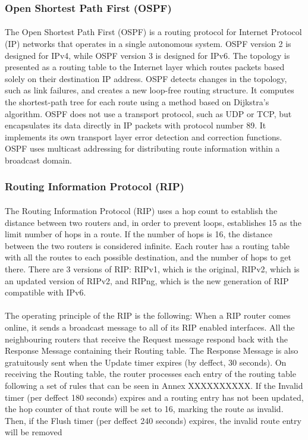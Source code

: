 \subsubsection*{Open Shortest Path First (OSPF)\cite{OSPFv2}\cite{OSPFIPv6}}
\paragraph{}The Open Shortest Path First (OSPF) is a routing protocol for Internet Protocol (IP) networks that operates in a single autonomous system. OSPF version 2 is designed for IPv4, while OSPF version 3 is designed for IPv6. The topology is presented as a routing table to the Internet layer which routes packets based solely on their destination IP address. OSPF detects changes in the topology, such as link failures, and creates a new loop-free routing structure. It computes the shortest-path tree for each route using a method based on Dijkstra's algorithm. OSPF does not use a transport protocol, such as UDP or TCP, but encapsulates its data directly in IP packets with protocol number 89. It implements its own transport layer error detection and correction functions. OSPF uses multicast addressing for distributing route information within a broadcast domain.

\subsubsection*{Routing Information Protocol (RIP)\cite{RIPv2}\cite{RIPng}}
\paragraph{}The Routing Information Protocol (RIP) uses a hop count to establish the distance between two routers and, in order to prevent loops, establishes 15 as the limit number of hops in a route. If the number of hops is 16, the distance between the two routers is considered infinite. Each router has a routing table with all the routes to each possible destination, and the number of hops to get there. There are 3 versions of RIP: RIPv1, which is the original, RIPv2, which is an updated version of RIPv2, and RIPng, which is the new generation of RIP compatible with IPv6.
\paragraph{}The operating principle of the RIP is the following: When a RIP router comes online, it sends a broadcast message to all of its RIP enabled interfaces. All the neighbouring routers that receive the Request message respond back with the Response Message containing their Routing table. The Response Message is also gratuitously sent when the Update timer expires (by deffect, 30 seconds). On receiving the Routing table, the router processes each entry of the routing table following a set of rules that can be seen in Annex XXXXXXXXXX. If the Invalid timer (per deffect 180 seconds) expires and a routing entry has not been updated, the hop counter of that route will be set to 16, marking the route as invalid. Then, if the Flush timer (per deffect 240 seconds) expires, the invalid route entry will be removed

